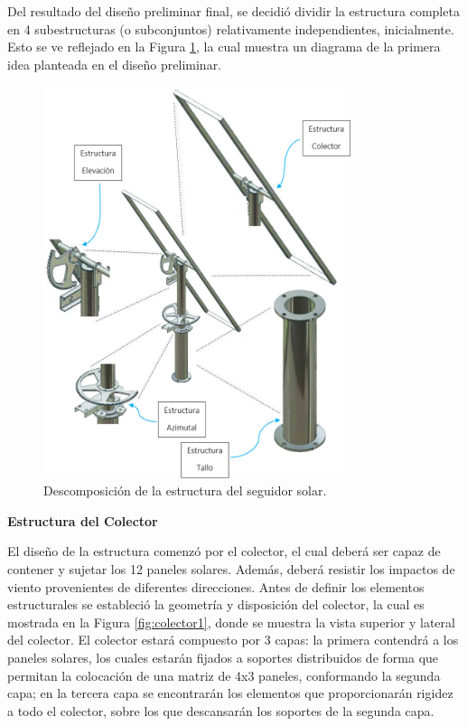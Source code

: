 Del resultado del diseño preliminar final, se decidió dividir la estructura completa en 4 subestructuras (o subconjuntos) relativamente independientes, inicialmente. Esto se ve reflejado en la Figura \ref{fig:descomp}, la cual muestra un diagrama de la primera idea planteada en el diseño preliminar.
\begin{figure}[H]
	\centering
	\includegraphics[width=9cm]{imagenes/descomposicion}
	\caption{Descomposición de la estructura del seguidor solar.}
	\label{fig:descomp}
\end{figure}

\textbf{Estructura del Colector}

El diseño de la estructura comenzó por el colector, el cual deberá ser capaz de contener y sujetar los 12 paneles solares. Además, deberá resistir los impactos de viento provenientes de diferentes direcciones. Antes de definir los elementos estructurales se estableció la geometría y disposición del colector, la cual es mostrada en la Figura \ref{fig:colector1}, donde se muestra la vista superior y lateral del colector. El colector estará compuesto por 3 capas: la primera contendrá a los paneles solares, los cuales estarán fijados a soportes distribuidos de forma que permitan la colocación de una matriz de 4x3 paneles, conformando la segunda capa; en la tercera capa se encontrarán los elementos que proporcionarán rigidez a todo el colector, sobre los que descansarán los soportes de la segunda capa.\\

